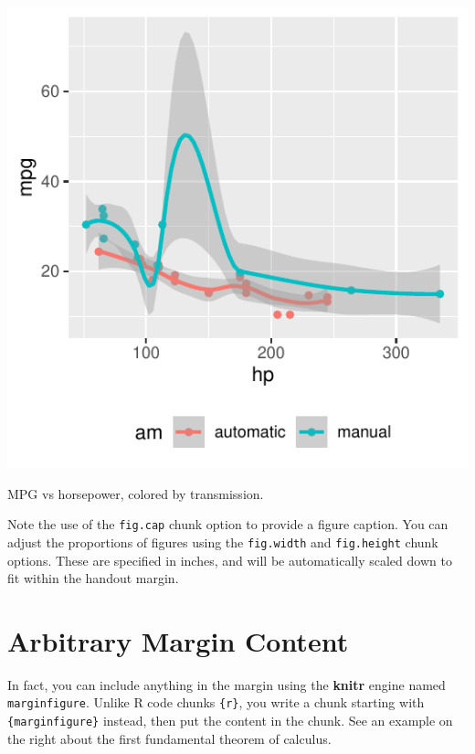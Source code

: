 \documentclass[]{tufte-book}
\begin{document}
\begin{marginfigure}
\includegraphics{deleteme_files/figure-latex/fig-margin-1} \caption[MPG vs horsepower, colored by transmission]{MPG vs horsepower, colored by transmission.}\label{fig:fig-margin}
\end{marginfigure}

Note the use of the \texttt{fig.cap} chunk option to provide a figure
caption. You can adjust the proportions of figures using the
\texttt{fig.width} and \texttt{fig.height} chunk options. These are
specified in inches, and will be automatically scaled down to fit within
the handout margin.

\hypertarget{arbitrary-margin-content}{%
\section{Arbitrary Margin Content}\label{arbitrary-margin-content}}

In fact, you can include anything in the margin using the \textbf{knitr}
engine named \texttt{marginfigure}. Unlike R code chunks
\texttt{\textasciigrave{}\textasciigrave{}\textasciigrave{}\{r\}}, you
write a chunk starting with
\texttt{\textasciigrave{}\textasciigrave{}\textasciigrave{}\{marginfigure\}}
instead, then put the content in the chunk. See an example on the right
about the first fundamental theorem of calculus.
\end{document}

